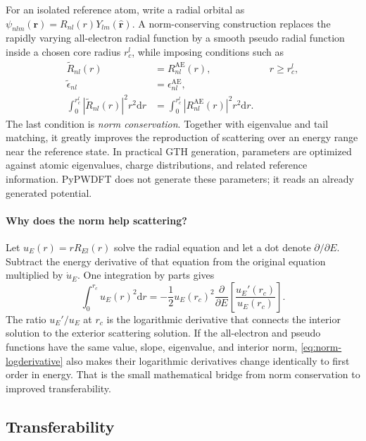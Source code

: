 \documentclass[10pt,twocolumn]{article}
\newcommand{\dd}{\mathrm{d}}
\newcommand{\rvec}{\mathbf r}
\begin{document}
For an isolated reference atom, write a radial orbital as
\(\psi_{nlm}(\rvec)=R_{nl}(r)Y_{lm}(\hat{\rvec})\).  A
norm-conserving construction replaces the rapidly varying all-electron radial
function by a smooth pseudo radial function inside a chosen core radius
\(r_c^l\), while imposing conditions such as
\begin{align}
\widetilde R_{nl}(r)&=R_{nl}^{\mathrm{AE}}(r),
&&r\ge r_c^l,\\
\widetilde\epsilon_{nl}&=\epsilon_{nl}^{\mathrm{AE}},\\
\int_0^{r_c^l}|\widetilde R_{nl}(r)|^2r^2\dd r
&=
\int_0^{r_c^l}|R_{nl}^{\mathrm{AE}}(r)|^2r^2\dd r.
\label{eq:norm-conservation}
\end{align}
The last condition is \emph{norm conservation}.  Together with eigenvalue and
tail matching, it greatly improves the reproduction of scattering over an
energy range near the reference state.  In practical GTH generation,
parameters are optimized against atomic eigenvalues, charge distributions,
and related reference information.  PyPWDFT does not generate these
parameters; it reads an already generated potential.

\paragraph{Why does the norm help scattering?}
Let \(u_E(r)=rR_{El}(r)\) solve the radial equation and let a dot denote
\(\partial/\partial E\).  Subtract the energy derivative of that equation
from the original equation multiplied by \(\dot u_E\).  One integration by
parts gives
\begin{equation}
\int_0^{r_c}u_E(r)^2\dd r
=-\frac12u_E(r_c)^2
\frac{\partial}{\partial E}
\left[\frac{u_E'(r_c)}{u_E(r_c)}\right].
\label{eq:norm-logderivative}
\end{equation}
The ratio \(u_E'/u_E\) at \(r_c\) is the logarithmic derivative that connects
the interior solution to the exterior scattering solution.  If the
all-electron and pseudo functions have the same value, slope, eigenvalue, and
interior norm, \cref{eq:norm-logderivative} also makes their logarithmic
derivatives change identically to first order in energy.  That is the small
mathematical bridge from norm conservation to improved transferability.

\subsection{Transferability}
\end{document}
